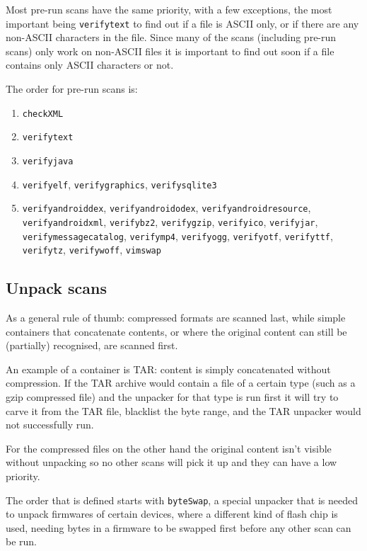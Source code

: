 \documentclass[10pt]{article}
\begin{document}
Most pre-run scans have the same priority, with a few exceptions, the most
important being \texttt{verifytext} to find out if a file is ASCII only, or if
there are any non-ASCII characters in the file. Since many of the scans
(including pre-run scans) only work on non-ASCII files it is important to find
out soon if a file contains only ASCII characters or not.

The order for pre-run scans is:

\begin{enumerate}
\item \texttt{checkXML}
\item \texttt{verifytext}
\item \texttt{verifyjava}
\item \texttt{verifyelf}, \texttt{verifygraphics}, \texttt{verifysqlite3}
\item \texttt{verifyandroiddex}, \texttt{verifyandroidodex},
\texttt{verifyandroidresource}, \texttt{verifyandroidxml}, \texttt{verifybz2},
\texttt{verifygzip}, \texttt{verifyico}, \texttt{verifyjar},
\texttt{verifymessagecatalog}, \texttt{verifymp4}, \texttt{verifyogg},
\texttt{verifyotf}, \texttt{verifyttf}, \texttt{verifytz}, \texttt{verifywoff},
\texttt{vimswap}
\end{enumerate}

\subsection{Unpack scans}

As a general rule of thumb: compressed formats are scanned last, while
simple containers that concatenate contents, or where the original content can
still be (partially) recognised, are scanned first.

An example of a container is TAR: content is simply concatenated without
compression. If the TAR archive would contain a file of a certain type (such as
a gzip compressed file) and the unpacker for that type is run first it will try
to carve it from the TAR file, blacklist the byte range, and the TAR unpacker
would not successfully run.

For the compressed files on the other hand the original content isn't visible
without unpacking so no other scans will pick it up and they can have a low
priority.

The order that is defined starts with \texttt{byteSwap}, a special unpacker
that is needed to unpack firmwares of certain devices, where a different kind
of flash chip is used, needing bytes in a firmware to be swapped first before
any other scan can be run.
\end{document}
